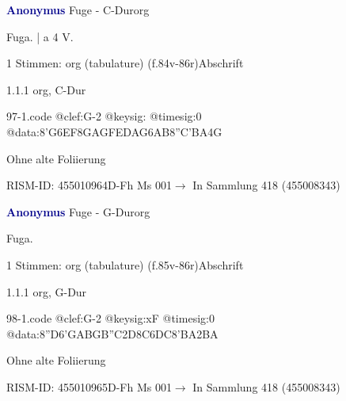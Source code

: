 \documentclass[twocolumn]{book}
\begin{document}
\par \vspace{7pt} \textcolor{darkblue}{\textbf{Anonymus  }}\hfillplus{\textbf{[97]}}\newline Fuge - C-Dur\newline org
\par \begin{itshape}[f.84v, at left:] Fuga. | a 4 V.\end{itshape} 
\par \textcolor{darkblue}{}  1 Stimmen: org (tabulature)  (f.84v-86r)\newline Abschrift
\par 1.1.1  org, C-Dur  
\begin{filecontents*}{97-1.code}
@clef:G-2
@keysig:
@timesig:0
@data:{8'G6EF8GA}{GFED}{AG6AB8''C}{'BA}4G
\end{filecontents*}
\newline
%
\par Ohne alte Foliierung
\par RISM-ID: 455010964\newline D-Fh  Ms 001\newline $\rightarrow$ In Sammlung 418 (455008343)
      
\par \vspace{7pt} \textcolor{darkblue}{\textbf{Anonymus  }}\hfillplus{\textbf{[98]}}\newline Fuge - G-Dur\newline org
\par \begin{itshape}[f.86r, at left:] Fuga.\end{itshape} 
\par \textcolor{darkblue}{}  1 Stimmen: org (tabulature)  (f.85v-86r)\newline Abschrift
\par 1.1.1  org, G-Dur  
\begin{filecontents*}{98-1.code}
@clef:G-2
@keysig:xF
@timesig:0
@data:{8''D6'GA}{BGB''C}2D{8C6DC}{8'BA}2BA
\end{filecontents*}
\newline
%
\par Ohne alte Foliierung
\par RISM-ID: 455010965\newline D-Fh  Ms 001\newline $\rightarrow$ In Sammlung 418 (455008343)
      
\end{document}
